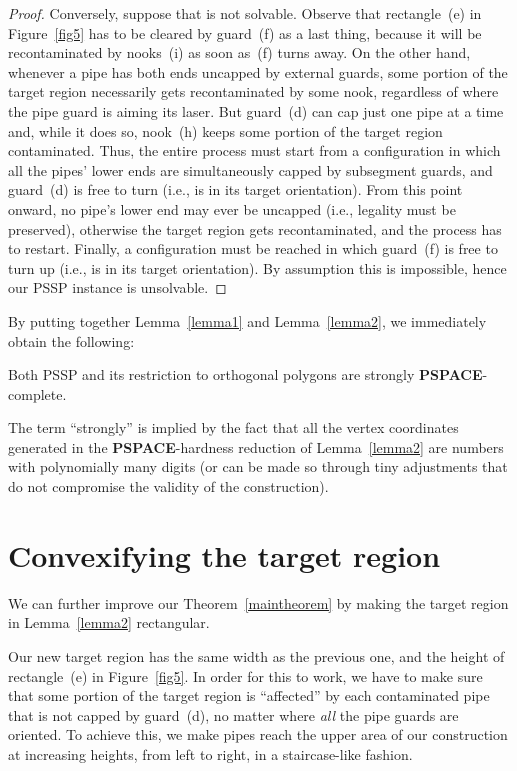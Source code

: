 \documentclass{style}
\newcommand{\complexityclass}[1]{\textbf{#1}}
\newcommand{\computproblem}[1]{\textsc{#1}}
\newcommand{\PSPACE}{\complexityclass{PSPACE}\xspace}
\newcommand{\PSSP}{\computproblem{PSSP}\xspace}
\begin{document}
\begin{proof}
Conversely, suppose that  is not solvable. Observe that rectangle~(e) in Figure~\ref{fig5} has to be cleared by guard~(f) as a last thing, because it will be recontaminated by nooks~(i) as soon as~(f) turns away. On the other hand, whenever a pipe has both ends uncapped by external guards, some portion of the target region necessarily gets recontaminated by some nook, regardless of where the pipe guard is aiming its laser. But guard~(d) can cap just one pipe at a time and, while it does so, nook~(h) keeps some portion of the target region contaminated. Thus, the entire process must start from a configuration  in which all the pipes' lower ends are simultaneously capped by subsegment guards, and guard~(d) is free to turn (i.e.,  is in its target orientation). From this point onward, no pipe's lower end may ever be uncapped (i.e., legality must be preserved), otherwise the target region gets recontaminated, and the process has to restart. Finally, a configuration  must be reached in which guard~(f) is free to turn up (i.e.,  is in its target orientation). By assumption this is impossible, hence our \PSSP instance is unsolvable.
\end{proof}

By putting together Lemma~\ref{lemma1} and Lemma~\ref{lemma2}, we immediately obtain the following:

\begin{theorem} \label{maintheorem}
Both \PSSP and its restriction to orthogonal polygons are strongly \PSPACE-complete. \hfill 
\end{theorem}

The term ``strongly'' is implied by the fact that all the vertex coordinates generated in the \PSPACE-hardness reduction of Lemma~\ref{lemma2} are numbers with polynomially many digits (or can be made so through tiny adjustments that do not compromise the validity of the construction).

\section{Convexifying the target region} \label{convexregion}

We can further improve our Theorem~\ref{maintheorem} by making the target region in Lemma~\ref{lemma2} rectangular.

Our new target region has the same width as the previous one, and the height of rectangle~(e) in Figure~\ref{fig5}. In order for this to work, we have to make sure that some portion of the target region is ``affected'' by each contaminated pipe that is not capped by guard~(d), no matter where \emph{all} the pipe guards are oriented. To achieve this, we make pipes reach the upper area of our construction at increasing heights, from left to right, in a staircase-like fashion.
\end{document}
